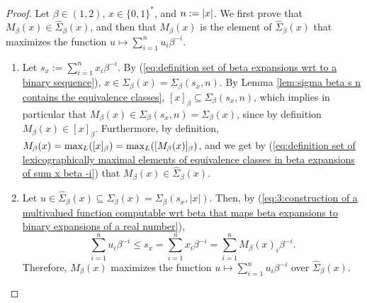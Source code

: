 \begin{proof}
    Let $\beta \in (1,2)$, $x \in \{0,1\}^\ast$, and $n := \left| x \right|$. We first prove that $M_\beta(x) \in \hat \Sigma_\beta(x)$, and then that $M_\beta(x)$ is the element of $\hat \Sigma_\beta(x)$ that maximizes the function $u \mapsto \sum_{i=1}^n u_i \beta^{-i}$.
    \begin{enumerate}[label = (\alph*)]
        \item Let $s_x := \sum_{i=1}^n x_i \beta^{-i}$. By (\ref{eq:definition set of beta expansions wrt to a binary sequence}), $x \in \Sigma_\beta(x) = \Sigma_\beta(s_x, n)$. By Lemma \ref{lem:sigma beta s n contains the equivalence classes}, $[x]_\beta \subseteq \Sigma_\beta(s_x,n)$, which implies in particular that $M_\beta(x) \in \Sigma_\beta(s_x,n) = \Sigma_\beta(x)$, since by definition $M_\beta(x) \in [x]_\beta$. Furthermore, by definition, $M_\beta(x) = \mathop{\operatorname{max}_L} ([x]_\beta) = \mathop{\operatorname{max}_L} ([M_\beta(x)]_\beta)$, and we get by (\ref{eq:definition set of lexicographically maximal elements of equivalence classes in beta expansions of sum x beta -i}) that $M_\beta(x) \in \hat \Sigma_\beta(x)$.
        \item Let $u \in \hat \Sigma_\beta(x) \subseteq \Sigma_\beta(x) = \Sigma_\beta(s_x, |x|)$. Then, by (\ref{eq:3:construction of a multivalued function computable wrt beta that maps beta expansions to binary expansions of a real number}), 
        \begin{equation}
            \sum_{i=1}^n u_i \beta^{-i} \leq s_x = \sum_{i=1}^n x_i \beta^{-i} = \sum_{i=1}^n M_\beta(x)_i \beta^{-i}.
        \end{equation}
        Therefore, $M_\beta(x)$ maximizes the function $u \mapsto \sum_{i=1}^n u_i \beta^{-i}$ over $\hat \Sigma_\beta(x)$.
    \end{enumerate}
\end{proof}

